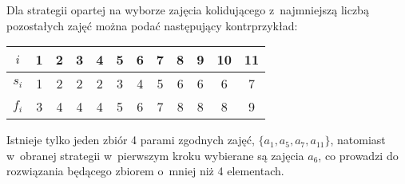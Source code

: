 Dla strategii opartej na wyborze zajęcia kolidującego z~najmniejszą liczbą pozostałych zajęć można podać następujący kontrprzykład:
\begin{center}
	\begin{tabular}{cccccccccccc}
		$i$ & 1 & 2 & 3 & 4 & 5 & 6 & 7 & 8 & 9 & 10 & 11 \\ \hline
		$s_i$ & 1 & 2 & 2 & 2 & 3 & 4 & 5 & 6 & 6 & 6 & 7 \\
		$f_i$ & 3 & 4 & 4 & 4 & 5 & 6 & 7 & 8 & 8 & 8 & 9
	\end{tabular}
\end{center}
Istnieje tylko jeden zbiór 4 parami zgodnych zajęć, $\{a_1,a_5,a_7,a_{11}\}$, natomiast w~obranej strategii w~pierwszym kroku wybierane są zajęcia $a_6$, co prowadzi do rozwiązania będącego zbiorem o~mniej niż 4 elementach.
